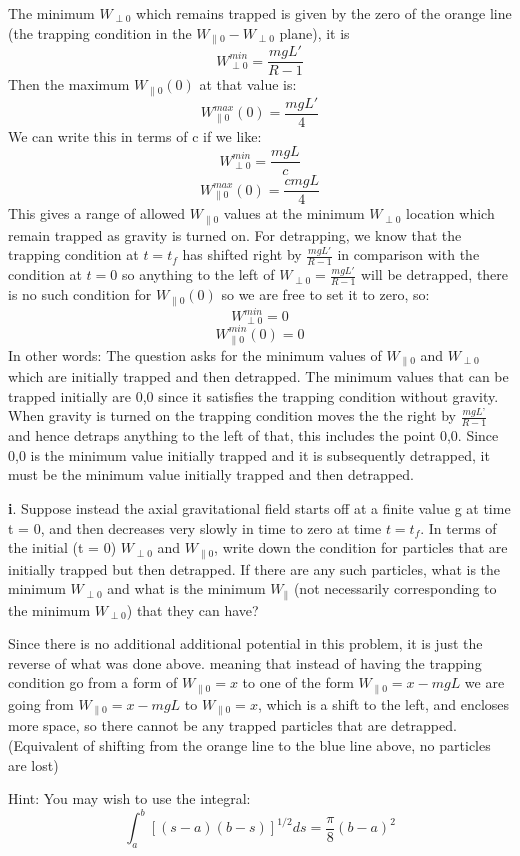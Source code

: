 \documentclass[12pt]{article}
\begin{document}
The minimum $W_{\perp0}$ which remains trapped is given by the zero of the orange line (the trapping condition in the $W_{\parallel0}-W_{\perp0}$ plane), it is
$$W^{min}_{\perp0}=\frac{mgL'}{R-1}$$
Then the maximum $W_{\parallel0}(0)$ at that value is:
$$W^{max}_{\parallel0}(0)=\frac{mgL'}{4}$$
We can write this in terms of c if we like:
$$W^{min}_{\perp0}=\frac{mgL}{c}$$
$$W^{max}_{\parallel0}(0)=\frac{cmgL}{4}$$
This gives a range of allowed $W_{\parallel0}$ values at the minimum $W_{\perp0}$ location which remain trapped as gravity is turned on. For detrapping, we know that the trapping condition at $t=t_f$ has shifted right by $\frac{mgL'}{R-1}$ in comparison with the condition at $t=0$ so anything to the left of $W_{\perp0}=\frac{mgL'}{R-1}$ will be detrapped, there is no such condition for $W_{\parallel0}(0)$ so we are free to set it to zero, so:
$$\boxed{W^{min}_{\perp0}=0}$$
$$\boxed{W^{min}_{\parallel0}(0)=0}$$
In other words: The question asks for the minimum values of $W_{\parallel0}$ and $W_{\perp0}$ which are initially trapped and then detrapped. The minimum values that can be trapped initially are 0,0 since it satisfies the trapping condition without gravity. When gravity is turned on the trapping condition moves the the right by $\frac{mgL’}{R-1}$ and hence detraps anything to the left of that, this includes the point 0,0. Since 0,0 is the minimum value initially trapped and it is subsequently detrapped, it must be the minimum value initially trapped and then detrapped.
\vspace{3mm}

\noindent\textbf{i}. Suppose instead the axial gravitational field starts off at a finite value g at time
t = 0, and then decreases very slowly in time to zero at time $t=t_f$. In terms of the
initial (t = 0) $W_{\perp 0}$ and $W_{\parallel 0}$, write down the condition for particles that are initially
trapped but then detrapped. If there are any such particles, what is the minimum
$W_{\perp 0}$ and what is the minimum $W_{\parallel}$ (not necessarily corresponding to the minimum
$W_{\perp 0}$) that they can have?

Since there is no additional additional potential in this problem, it is just the reverse of what was done above. meaning that instead of having the trapping condition go from a form of $W_{\parallel0}=x$ to one of the form $W_{\parallel0}=x-mgL$ we are going from $W_{\parallel0}=x-mgL$ to $W_{\parallel0}=x$, which is a shift to the left, and encloses more space, so there cannot be any trapped particles that are detrapped. (Equivalent of shifting from the orange line to the blue line above, no particles are lost)

\vspace{2mm}

Hint: You may wish to use the integral:
$$\int^b_a[(s-a)(b-s)]^{1/2}ds=\frac{\pi}{8}(b-a)^2$$
\end{document}
